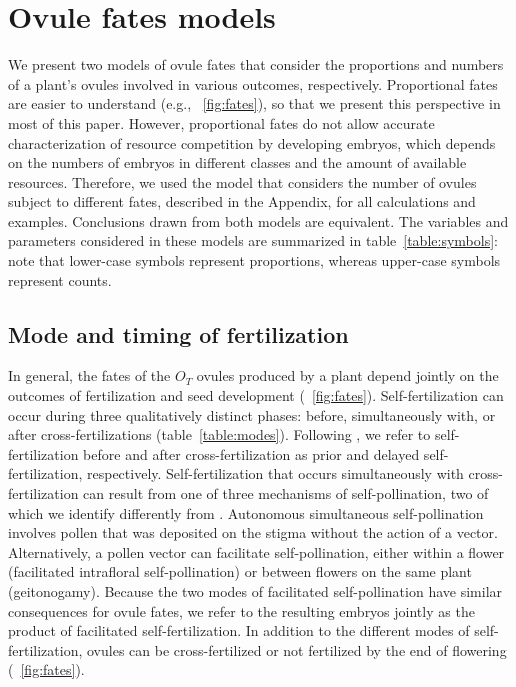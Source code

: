 \documentclass[letterpaper,titlepage]{scrartcl}
\newcommand{\tref}{table} \newcommand{\eref}{equation}
\begin{document}
\section{Ovule fates models}
We present two models of ovule fates that consider the proportions and
numbers of a plant's ovules involved in various outcomes,
respectively. Proportional fates are easier to understand (e.g.,
{\fref}~\ref{fig:fates}), so that we present this perspective in most
of this paper. However, proportional fates do not allow accurate
characterization of resource competition by developing embryos, which
depends on the numbers of embryos in different classes and the amount
of available resources. Therefore, we used the model that considers
the number of ovules subject to different fates, described in the
Appendix, for all calculations and examples. Conclusions drawn from
both models are equivalent. The variables and parameters considered in
these models are summarized in {\tref}~\ref{table:symbols}: note that
lower-case symbols represent proportions, whereas upper-case symbols
represent counts.

\subsection{Mode and timing of fertilization}
In general, the fates of the $O_{T}$ ovules produced by a plant depend
jointly on the outcomes of fertilization and seed development
({\fref}~\ref{fig:fates}). Self-fertilization can occur during three
qualitatively distinct phases: before, simultaneously with, or after
cross-fertilizations ({\tref}~\ref{table:modes}). Following
\citet{Lloyd92a}, we refer to self-fertilization before and after
cross-fertilization as prior and delayed self-fertilization,
respectively. Self-fertilization that occurs simultaneously with
cross-fertilization can result from one of three mechanisms of
self-pollination, two of which we identify differently from
\citeauthor{Lloyd92a} \citetext{\citeyear{Lloyd92a}: see
  {\tref}~\ref{table:modes}}. Autonomous simultaneous self-pollination
involves pollen that was deposited on the stigma without the action of
a vector. Alternatively, a pollen vector can facilitate
self-pollination, either within a flower (facilitated intrafloral
self-pollination) or between flowers on the same plant
(geitonogamy). Because the two modes of facilitated self-pollination
have similar consequences for ovule fates, we refer to the resulting
embryos jointly as the product of facilitated self-fertilization. In
addition to the different modes of self-fertilization, ovules can be
cross-fertilized or not fertilized by the end of flowering
({\fref}~\ref{fig:fates}).
\end{document}
